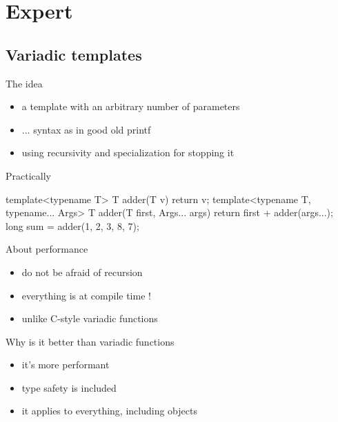 \section[exp]{Expert \cpp}

\subsection[tmpl]{Variadic templates}


\begin{frame}[fragile]
  \begin{block}{The idea}
    \begin{itemize}
    \item a template with an arbitrary number of parameters
    \item ... syntax as in good old printf
    \item using recursivity and specialization for stopping it
    \end{itemize}
  \end{block}
  \begin{exampleblock}{Practically}
    \begin{cppcode*}{}
      template<typename T>
      T adder(T v) {
        return v;
      }
      template<typename T, typename... Args>
      T adder(T first, Args... args) {
        return first + adder(args...);
      }
      long sum = adder(1, 2, 3, 8, 7);
    \end{cppcode*}
  \end{exampleblock}
\end{frame}

\begin{frame}
  \begin{block}{About performance}
    \begin{itemize}
    \item do not be afraid of recursion
    \item everything is at compile time !
    \item unlike C-style variadic functions
    \end{itemize}
  \end{block}
  \begin{block}{Why is it better than variadic functions}
    \begin{itemize}
    \item it's more performant
    \item type safety is included
    \item it applies to everything, including objects
    \end{itemize}    
  \end{block}
\end{frame}
  
